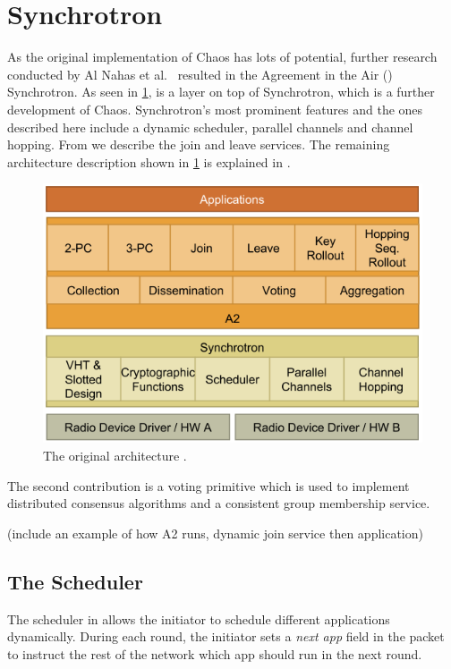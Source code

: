 \section{\atwo{} Synchrotron}
\label{sec:chaos-a2-background}
As the original implementation of Chaos has lots of potential, further research conducted by Al Nahas et al.~\cite{a2-introduction-paper} resulted in the Agreement in the Air (\atwo{}) Synchrotron.
As seen in \cref{fig:original-a2-architecture}, \atwo{} is a layer on top of Synchrotron, which is a further development of Chaos. Synchrotron's most prominent features and the ones described here include a dynamic scheduler, parallel channels and channel hopping. From \atwo{} we describe the join and leave services. The remaining architecture description shown in \cref{fig:original-a2-architecture} is explained in \cite{a2-introduction-paper}.

\begin{figure}[bt]
    \centering
    \includegraphics[scale=0.7]{figure/original-architechture.png}
    \caption{The original \atwo{} architecture \cite{a2-introduction-paper}.}
    \label{fig:original-a2-architecture}
\end{figure}

The second contribution is a voting primitive which is used to implement distributed consensus algorithms and a consistent group membership service. 

(include an example of how A2 runs, dynamic join service then application)

\subsection{The Scheduler}
The scheduler in \atwo{} allows the initiator to schedule different applications dynamically. During each round, the initiator sets a \textit{next app} field in the packet to instruct the rest of the network which app should run in the next round.

